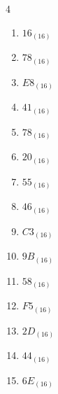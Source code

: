\begin{multicols}{4}
\begin{enumerate}
        \phantom{$=188$}

  \item $16_{(16)}$

        \phantom{$=22$}

  \item $78_{(16)}$

        \phantom{$=120$}

  \item $E8_{(16)}$

        \phantom{$=232$}

  \item $41_{(16)}$

        \phantom{$=65$}

  \item $78_{(16)}$

        \phantom{$=120$}

  \item $20_{(16)}$

        \phantom{$=32$}

  \item $55_{(16)}$

        \phantom{$=85$}

  \item $46_{(16)}$

        \phantom{$=70$}

  \item $C3_{(16)}$

        \phantom{$=195$}

  \item $9B_{(16)}$

        \phantom{$=155$}

  \item $58_{(16)}$

        \phantom{$=88$}

\columnbreak %

  \item $F5_{(16)}$

        \phantom{$=245$}

  \item $2D_{(16)}$

        \phantom{$=45$}

  \item $44_{(16)}$

        \phantom{$=68$}

  \item $6E_{(16)}$

        \phantom{$=110$}


\end{enumerate}
\end{multicols}
